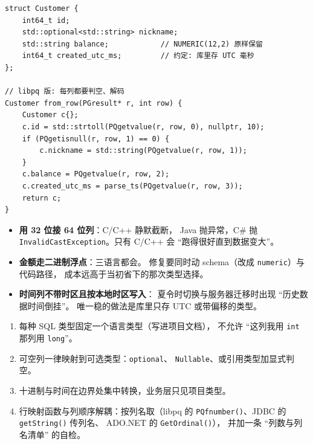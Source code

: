 \documentclass[12pt,a4paper,fontset=fandol]{ctexbook}
\newcommand{\Fn}[1]{\texttt{#1()}}
\newcommand{\Tp}[1]{\texttt{#1}}
\newcommand{\CSharp}{C\#}
\newcommand{\CppJava}{C/C++}
\begin{document}
\begin{lstlisting}[caption={C/C++：一个手写行映射的样子}]
struct Customer {
    int64_t id;
    std::optional<std::string> nickname;
    std::string balance;            // NUMERIC(12,2) 原样保留
    int64_t created_utc_ms;         // 约定: 库里存 UTC 毫秒
};

// libpq 版: 每列都要判空、解码
Customer from_row(PGresult* r, int row) {
    Customer c{};
    c.id = std::strtoll(PQgetvalue(r, row, 0), nullptr, 10);
    if (PQgetisnull(r, row, 1) == 0) {
        c.nickname = std::string(PQgetvalue(r, row, 1));
    }
    c.balance = PQgetvalue(r, row, 2);
    c.created_utc_ms = parse_ts(PQgetvalue(r, row, 3));
    return c;
}
\end{lstlisting}

\begin{warning}[title=三个最贵的映射错误]
\begin{itemize}
  \item \textbf{用 32 位接 64 位列}：\CppJava{} 静默截断，
        Java 抛异常，\CSharp{} 抛
        \Tp{Invalid\allowbreak{}Cast\allowbreak{}Exception}。只有 \CppJava{} 会
        ``跑得很好直到数据变大''。
  \item \textbf{金额走二进制浮点}：三语言都会。
        修复要同时动 schema（改成 \texttt{numeric}）与代码路径，
        成本远高于当初省下的那次类型选择。
  \item \textbf{时间列不带时区且按本地时区写入}：
        夏令时切换与服务器迁移时出现 ``历史数据时间倒挂''。
        唯一稳的做法是库里只存 UTC 或带偏移的类型。
\end{itemize}
\end{warning}

\begin{bestpractice}[title=映射层的最小约定]
\begin{enumerate}
  \item 每种 SQL 类型固定一个语言类型（写进项目文档），
        不允许 ``这列我用 \Tp{int} 那列用 \Tp{long}''。
  \item 可空列一律映射到可选类型：\Tp{optional}、
        \Tp{Nullable}、或引用类型加显式判空。
  \item 十进制与时间在边界处集中转换，业务层只见项目类型。
  \item 行映射函数与列顺序解耦：按列名取（libpq 的
        \Fn{PQfnumber}、JDBC 的 \Fn{getString} 传列名、
        ADO.NET 的 \Fn{GetOrdinal}），
        并加一条 ``列数与列名清单'' 的自检。
\end{enumerate}
\end{bestpractice}
\end{document}
